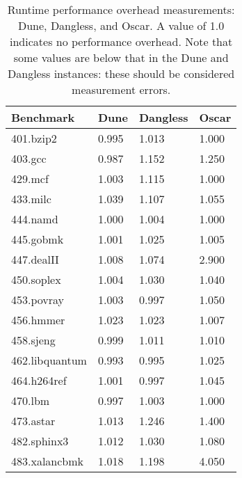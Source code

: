 \begin{table}[]
	\centering
	\begin{tabular}{|l|l|l|l|}
		\hline
		\textbf{Benchmark} & \textbf{Dune} & \textbf{Dangless} & \textbf{Oscar} \\ \hline
		401.bzip2          & 0.995         & 1.013             & 1.000                      \\ \hline
		403.gcc            & 0.987         & 1.152             & 1.250                      \\ \hline
		429.mcf            & 1.003         & 1.115             & 1.000                      \\ \hline
		433.milc           & 1.039         & 1.107             & 1.055                      \\ \hline
		444.namd           & 1.000         & 1.004             & 1.000                      \\ \hline
		445.gobmk          & 1.001         & 1.025             & 1.005                      \\ \hline
		447.dealII         & 1.008         & 1.074             & 2.900                      \\ \hline
		450.soplex         & 1.004         & 1.030             & 1.040                      \\ \hline
		453.povray         & 1.003         & 0.997             & 1.050                      \\ \hline
		456.hmmer          & 1.023         & 1.023             & 1.007                      \\ \hline
		458.sjeng          & 0.999         & 1.011             & 1.010                      \\ \hline
		462.libquantum     & 0.993         & 0.995             & 1.025                      \\ \hline
		464.h264ref        & 1.001         & 0.997             & 1.045                      \\ \hline
		470.lbm            & 0.997         & 1.003             & 1.000                      \\ \hline
		473.astar          & 1.013         & 1.246             & 1.400                      \\ \hline
		482.sphinx3        & 1.012         & 1.030             & 1.080                      \\ \hline
		483.xalancbmk      & 1.018         & 1.198             & 4.050                      \\ \hline
	\end{tabular}
	\caption{Runtime performance overhead measurements: Dune, Dangless, and Oscar. A value of 1.0 indicates no performance overhead. Note that some values are below that in the Dune and Dangless instances: these should be considered measurement errors.}
	\label{tab:perf-dune-dangless-oscar}
\end{table}


